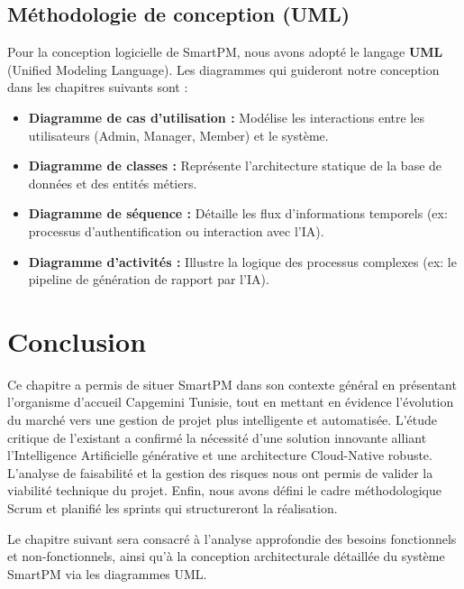 \subsection{Méthodologie de conception (UML)}

Pour la conception logicielle de SmartPM, nous avons adopté le langage \textbf{UML} (Unified Modeling Language). 
Les diagrammes qui guideront notre conception dans les chapitres suivants sont :

\begin{itemize}
  \item \textbf{Diagramme de cas d'utilisation :} Modélise les interactions entre les utilisateurs (Admin, Manager, Member) et le système.
  \item \textbf{Diagramme de classes :} Représente l'architecture statique de la base de données et des entités métiers.
  \item \textbf{Diagramme de séquence :} Détaille les flux d'informations temporels (ex: processus d'authentification ou interaction avec l'IA).
  \item \textbf{Diagramme d'activités :} Illustre la logique des processus complexes (ex: le pipeline de génération de rapport par l'IA).
\end{itemize}

\section*{Conclusion}

Ce chapitre a permis de situer SmartPM dans son contexte général en présentant l'organisme
d'accueil Capgemini Tunisie, tout en mettant en évidence l'évolution du marché vers une gestion 
de projet plus intelligente et automatisée. L'étude critique de l'existant a confirmé la nécessité 
d'une solution innovante alliant l'Intelligence Artificielle générative et une architecture Cloud-Native robuste.
L'analyse de faisabilité et la gestion des risques nous ont permis de valider la viabilité technique du projet. 
Enfin, nous avons défini le cadre méthodologique Scrum et planifié les sprints qui structureront la réalisation.

\vspace{0.3cm}

Le chapitre suivant sera consacré à l'analyse approfondie des besoins fonctionnels et non-fonctionnels, 
ainsi qu'à la conception architecturale détaillée du système SmartPM via les diagrammes UML.
